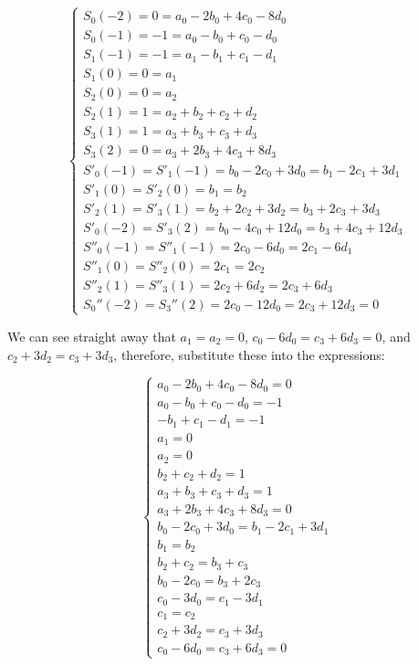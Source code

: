 \documentclass[11pt]{article}
\begin{document}
\[\left\{ \begin{array}{ll}
            S_0(-2) = 0 = a_0 - 2 b_0 + 4 c_0 - 8 d_0  \\
            S_0(-1) = -1 = a_0 - b_0 + c_0 - d_0 \\
            S_1(-1) = -1 = a_1 - b_1 + c_1 - d_1 \\
            S_1(0) = 0 =a_1 \\
            S_2(0) = 0 =a_2 \\
            S_2(1) = 1 =  a_2 + b_2 + c_2 + d_2 \\
            S_3(1) = 1 =  a_3 + b_3 + c_3 + d_3 \\
            S_3(2) = 0 = a_3 + 2 b_3 + 4 c_3 + 8 d_3 \\
            S'_0(-1) = S'_1(-1) = b_0 - 2 c_0 + 3 d_0 = b_1 - 2 c_1 + 3 d_1 \\
            S'_1(0) = S'_2(0) = b_1 = b_2\\
            S'_2(1) = S'_3(1) = b_2 + 2 c_2 + 3 d_2 = b_3 + 2 c_3 + 3 d_3 \\
            S'_0(-2) = S'_3(2) = b_0 - 4 c_0 + 12 d_0 = b_3 + 4 c_3 + 12 d_3 \\
            S''_0(-1) = S''_1(-1) = 2 c_0 - 6 d_0 = 2 c_1 - 6 d_1 \\
            S''_1(0) = S''_2(0) = 2 c_1 = 2 c_2 \\
            S''_2(1) = S''_3(1) = 2 c_2 + 6 d_2 = 2 c_3 + 6 d_3 \\
            S_0''(-2) = S_3''(2) = 2 c_0 - 12 d_0 = 2 c_3 + 12 d_3 = 0
            \end{array} \right.\]

    We can see straight away that \(a_1 = a_2 = 0\),
\(c_0 - 6 d_0 = c_3 + 6 d_3 = 0\), and \(c_2 + 3 d_2 = c_3 + 3 d_3\),
therefore, substitute these into the expressions:

\[\left\{ \begin{array}{ll}
            a_0 - 2 b_0 + 4 c_0 - 8 d_0 = 0\\
            a_0 - b_0 + c_0 - d_0 = -1\\
            - b_1 + c_1 - d_1 = -1\\
            a_1 = 0\\
            a_2 = 0\\
            b_2 + c_2 + d_2 = 1\\
            a_3 + b_3 + c_3 + d_3 = 1\\
            a_3 + 2 b_3 + 4 c_3 + 8 d_3 = 0\\
            b_0 - 2 c_0 + 3 d_0 = b_1 - 2 c_1 + 3 d_1 \\
            b_1 = b_2\\
            b_2 + c_2 = b_3 + c_3 \\
            b_0 - 2 c_0 = b_3 + 2 c_3 \\
            c_0 - 3 d_0 = c_1 - 3 d_1 \\
            c_1 = c_2 \\
            c_2 + 3 d_2 = c_3 + 3 d_3 \\
            c_0 - 6 d_0 = c_3 + 6 d_3 = 0
            \end{array} \right.\]
\end{document}

